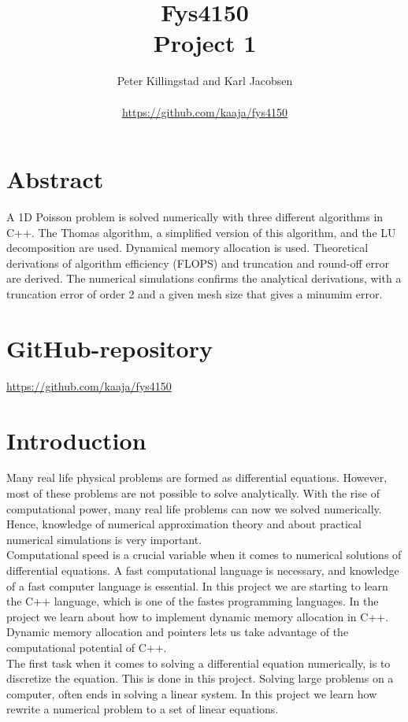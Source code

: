 \documentclass{article}
\title{Fys4150\\Project 1\\ }
\author{Peter Killingstad and Karl Jacobsen\\
\\
\url{https://github.com/kaaja/fys4150}}
\begin{document}
	
\maketitle

\section*{Abstract}
A 1D Poisson problem is solved numerically with three different algorithms in C++. The Thomas algorithm, a simplified version of this algorithm, and the LU decomposition are used. Dynamical memory allocation is used. Theoretical derivations of algorithm efficiency (FLOPS) and truncation and round-off error are derived. The numerical simulations confirms the analytical derivations, with a truncation error of order 2 and a given mesh size that gives a minumim error.

\tableofcontents

\pagebreak

\section{GitHub-repository}
\url{https://github.com/kaaja/fys4150}

\section{Introduction}
Many real life physical problems are formed as differential equations. However, most of these problems are not possible to solve analytically. With the rise of computational power, many real life problems can now we solved numerically. Hence, knowledge of numerical approximation theory and about practical numerical simulations is very important.\\

Computational speed is a crucial variable when it comes to numerical solutions of differential equations. A fast computational language is necessary, and knowledge of a fast computer language is essential. In this project we are starting to learn the C++ language, which is one of the fastes programming languages. In the project we learn about how to implement dynamic memory allocation in C++. Dynamic memory allocation and pointers lets us take advantage of the computational potential of C++.\\

The first task when it comes to solving a differential equation numerically, is to discretize the equation. This is done in this project. Solving large problems on a computer, often ends in solving a linear system. In this project we learn how rewrite a numerical problem to a set of linear equations. \\
\end{document}
